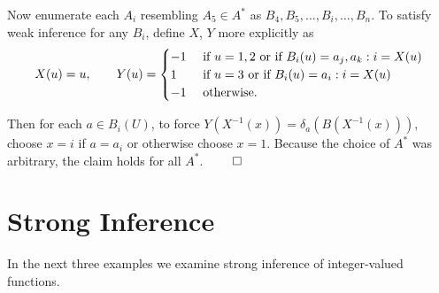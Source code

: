 \documentclass[11pt]{article}
\begin{document}
Now enumerate each $ A_i $ resembling $ A_5 \in A^{*} $ as $ B_4, B_5, \dots, B_i, \dots, B_n $. To satisfy weak inference for any $ B_i $, define $ X $, $ Y $ more explicitly as 
\begin{equation*} 
     X(u) = u, \quad \quad
     Y(u) = \begin{cases} 
    -1 & \text{ if } u = 1, 2 \text { or if } B_i(u) = a_j, a_k: i = X(u) \\
     1 & \text{ if } u = 3 \text{ or if } B_i(u) = a_i: i = X(u) \\
    -1 & \text { otherwise. } \\
            \end{cases} \\
\end{equation*}

Then for each $ a \in B_i(U) $, to force $ Y(X^{-1}(x)) = \delta_{a}(B(X^{-1}(x))) $, choose $ x = i $ if $ a = a_i $ or otherwise choose $ x = 1 $. Because the choice of $ A^{*} $ was arbitrary, the claim holds for all $ A^{*} $. $ \hfill \qed $ \\


\newpage
\section{Strong Inference} 
 
In the next three examples we examine strong inference of integer-valued functions. \\
 
\end{document}
